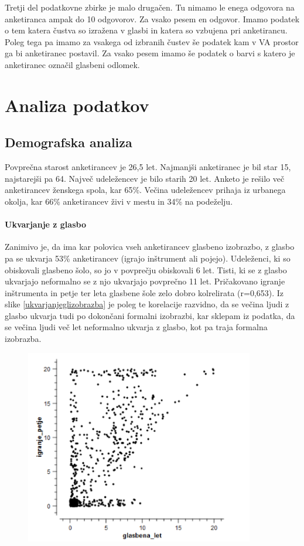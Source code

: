 \documentclass[a4paper, 12pt]{book}
\begin{document}
{Tretji del podatkovne zbirke je malo drugačen. Tu nimamo le enega odgovora na anketiranca ampak do 10 odgovorov. Za vsako pesem en odgovor. Imamo podatek o tem katera čustva so izražena v glasbi in katera so vzbujena pri anketirancu. Poleg tega pa imamo za vsakega od izbranih čustev še podatek kam v VA prostor ga bi anketiranec postavil. Za vsako pesem imamo še podatek o barvi s katero je anketiranec označil glasbeni odlomek.  

\section{Analiza podatkov}

\subsection{Demografska analiza}

Povprečna starost anketirancev je 26,5 let. Najmanjši anketiranec je bil star 15, najstarejši pa 64. Največ udeležencev je bilo starih 20 let. Anketo je rešilo več anketirancev ženskega spola, kar 65\%. Večina udeležencev prihaja iz urbanega okolja, kar 66\% anketirancev živi v mestu in 34\% na podeželju.

\paragraph{Ukvarjanje z glasbo}

Zanimivo je, da ima kar polovica vseh anketirancev glasbeno izobrazbo, z glasbo pa se ukvarja 53\% anketirancev (igrajo inštrument ali pojejo). Udeleženci, ki so obiskovali glasbeno šolo, so jo v povprečju obiskovali 6 let. Tisti, ki se z glasbo ukvarjajo neformalno se z njo ukvarjajo povprečno 11 let. Pričakovano igranje inštrumenta in petje ter leta glasbene šole zelo dobro kolrelirata (r=0,653). Iz slike \ref{ukvarjanjeglizobrazba} je poleg te korelacije razvidno, da se večina ljudi z glasbo ukvarja tudi po dokončani formalni izobrazbi, kar sklepam iz podatka, da se večina ljudi več let neformalno ukvarja z glasbo, kot pa traja formalna izobrazba. 

\begin{figure}[hbt]
\centering
\includegraphics[width=10cm]{images/izobrazba_ukvarjanje.png}


\end{figure}}
\end{document}
